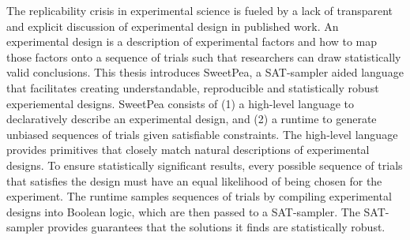 
The replicability crisis in experimental science is fueled by a lack of transparent and explicit discussion of experimental design in published work. An experimental design is a description of experimental factors and how to map those factors onto a sequence of trials such that researchers can draw statistically valid conclusions. This thesis introduces SweetPea, a SAT-sampler aided language that facilitates creating understandable, reproducible and statistically robust experiemental designs. SweetPea consists of (1) a high-level language to declaratively describe an experimental design, and (2) a runtime to generate unbiased sequences of trials given satisfiable constraints. The high-level language provides primitives that closely match natural descriptions of experimental designs. To ensure statistically significant results, every possible sequence of trials that satisfies the design must have an equal likelihood of being chosen for the experiment. The runtime samples sequences of trials by compiling experimental designs into Boolean logic, which are then passed to a SAT-sampler. The SAT-sampler provides guarantees that the solutions it finds are statistically robust.

